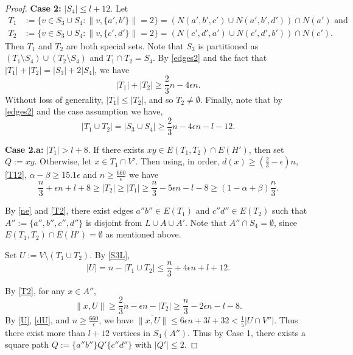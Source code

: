 \documentclass[oneside,12pt]{memoir}
\newcommand{\ep}{\epsilon}
\begin{document}
\begin{proof}
\noindent \textbf{Case 2:} $|S_{4}|\le l+12$.  Let 
\begin{align}
T_{1} & :=\{v\in S_{3}\cup S_4:\|v,\{a',b'\}\|=2\}=(N(a',b',c')\cup N(a',b',d'))\cap N(a')\textrm{ and }\\
T_{2} & :=\{v\in S_{3}\cup S_4:\|v,\{c',d'\}\|=2\}=(N(c',d',a')\cup N(c',d',b'))\cap N(c').
\end{align}
Then $T_1$ and $T_2$ are both special sets.  Note that $S_3$ is partitioned as $(T_1\setminus S_4)\cup (T_2\setminus S_4)$ and $T_1\cap T_2=S_4$.  By \eqref{edges2} and the fact that $|T_1|+|T_2|=|S_3|+2|S_4|$, we have
\begin{equation}
|T_1|+|T_2|\geq \frac{2}{3}n-4\ep n \label{T12}.
\end{equation}
Without loss of generality, $|T_{1}|\leq|T_{2}|$, and so $T_{2}\neq\emptyset$.  Finally, note that by \eqref{edges2} and the case assumption we have,
\begin{equation}
|T_1\cup T_2|=|S_{3}\cup S_4|\geq\frac{2}{3}n-4\ep n-l-12.\label{S3L}\end{equation}




\noindent \textbf{Case 2.a:} $|T_{1}|>l+8$. If there exists $xy\in E(T_{1},T_{2})\cap E(H')$,
then set $Q:=xy$. Otherwise, let $x\in T_{1}\cap V'$. Then using,
in order, $d(x)\geq(\frac{2}{3}-\ep)n$, \eqref{T12}, $\alpha-\beta\ge15.1\ep$ and $n\geq \frac{660}{\ep}$
we have \begin{equation}
\frac{n}{3}+\ep n+l+8\ge|T_{2}|\ge|T_{1}|\ge\frac{n}{3}-5\ep n-l-8\ge(1-\alpha+\beta)\frac{n}{3}.\label{T2}\end{equation}

By \eqref{ne} and \eqref{T2}, there exist edges $a''b''\in E(T_{1})$
and $c''d''\in E(T_{2})$ such that $A'':=\{a'',b'',c'',d''\}$ is disjoint from $L\cup A\cup A'$.  Note that $A''\cap S_4=\emptyset$, since $E(T_{1},T_{2})\cap E(H')=\emptyset$ as mentioned above.

Set $U:=V\setminus (T_1\cup T_2)$. By \eqref{S3L}, \begin{equation}
|U|=n-|T_1\cup T_2|\le\frac{n}{3}+4\ep n+l+12.\label{U}\end{equation}

By \eqref{T2}, for any $x\in A''$, \begin{equation}
\|x,U\|\ge\frac{2}{3}n-\ep n-|T_{2}|\ge\frac{n}{3}-2\ep n-l-8.\label{dU}\end{equation}
 By \eqref{U}, \eqref{dU}, and $n\geq\frac{660}{\ep}$, we have $\overline{\|x,U\|}\le6\ep n+3l+32<\frac{1}{5}|U\cap V''|$.
Thus there exist more than $l+12$ vertices in $S_4(A'')$.
Thus by Case 1, there exists a square path $Q:=\{a''b''\}Q'\{c''d''\}$ with $|Q'|\le 2$.


\end{proof}
\end{document}
